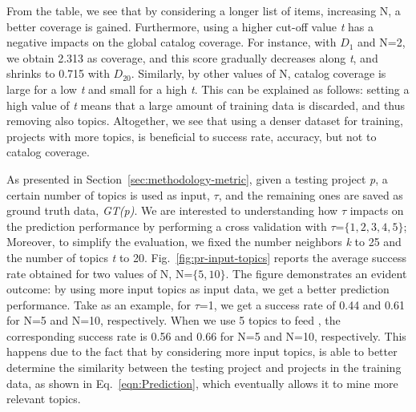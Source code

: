 
From the table, we see that by considering a longer list of items, \ie increasing N, a better coverage is gained. Furthermore, using a higher cut-off value \emph{t} has a negative impacts on the global catalog coverage. For instance, with $D_{1}$ and N=2, we obtain 2.313 as coverage, and this score gradually decreases along \emph{t}, and shrinks to 0.715 with $D_{20}$. Similarly, by other values of N, catalog coverage is large for a low \emph{t} and small for a high \emph{t}. This can be explained as follows: setting a high value of \emph{t} means that a large amount of training data is discarded, and thus removing also topics. Altogether, we see that using a denser dataset for training, \ie projects with more topics, is beneficial to success rate, accuracy, but not to catalog coverage.


As presented in Section~\ref{sec:methodology-metric}, given a testing project \emph{p}, a certain number of topics is used as input, \ie $\tau$, and the remaining ones are saved as ground truth data, \ie \emph{GT(p)}. We are interested to understanding how $\tau$ impacts on the prediction performance by performing a cross validation with $\tau$=$\{1,2,3,4,5\}$; Moreover, to simplify the evaluation, we fixed the number neighbors \emph{k} to 25 and the number of topics \emph{t} to 20. Fig.~\ref{fig:pr-input-topics} reports the average success rate obtained for two values of N, \ie N=$\{5,10\}$. %
The figure demonstrates an evident outcome: by using more input topics as input data, we get a better prediction performance. Take as an example, for $\tau$=1, we get a success rate of 0.44 and 0.61 for N=5 and N=10, respectively. When we use 5 topics to feed \TFa, the corresponding success rate is 0.56 and 0.66 for N=5 and N=10, respectively. This happens due to the fact that by considering more input topics, \TFa is able to better determine the similarity between the testing project and projects in the training data, as shown in Eq.~\ref{eqn:Prediction}, which eventually allows it to mine more relevant topics.

